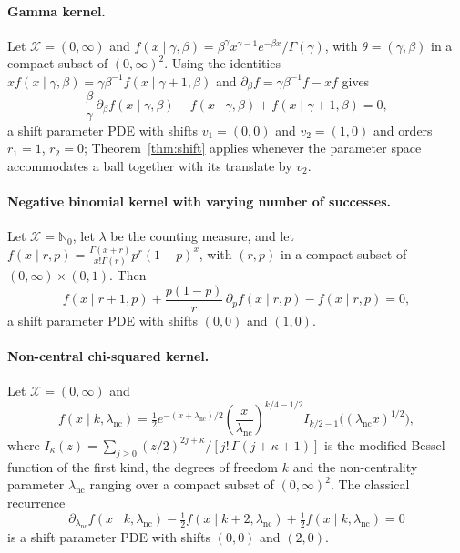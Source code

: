 \documentclass[11pt,twoside]{article} %
\begin{document}
\paragraph{Gamma kernel.} Let $\mathcal X=(0,\infty)$ and $f(x\mid\gamma,\beta)=\beta^\gamma x^{\gamma-1}e^{-\beta x}/\Gamma(\gamma)$, with $\theta =(\gamma,\beta)$ in a compact subset of $(0,\infty)^2$. Using the identities $xf(x\mid\gamma,\beta)=\gamma\beta^{-1}f(x\mid\gamma+1,\beta)$ and $\partial_\beta f=\gamma\beta^{-1}f-xf$ gives
%
\begin{equation*}
    \frac{\beta}{\gamma}\,\partial_\beta f(x\mid\gamma,\beta)-f(x\mid\gamma,\beta)+f(x\mid\gamma+1,\beta)=0,
\end{equation*}
%
a shift parameter PDE with shifts $v_1=(0,0)$ and $v_2=(1,0)$ and orders $r_1=1$, $r_2=0$; Theorem~\ref{thm:shift} applies whenever the parameter space accommodates a ball together with its translate by $v_2$.

\paragraph{Negative binomial kernel with varying number of successes.} Let $\mathcal X=\mathbb N_0$, let $\lambda$ be the counting measure, and let $f(x\mid r,p)=\frac{\Gamma(x+r)}{x!\Gamma(r)}p^r(1-p)^x$, with $(r,p)$ in a compact subset of $(0,\infty)\times(0,1)$. Then
%
\begin{equation*}
    f(x\mid r+1,p)+\frac{p(1-p)}{r}\,\partial_pf(x\mid r,p)-f(x\mid r,p)=0,
\end{equation*}
%
a shift parameter PDE with shifts $(0,0)$ and $(1,0)$.

\paragraph{Non-central chi-squared kernel.} Let $\mathcal X=(0,\infty)$ and
%
\begin{equation*}
    f(x\mid k,\lambda_{\mathrm{nc}})=\tfrac12e^{-(x+\lambda_{\mathrm{nc}})/2}\left(\frac{x}{\lambda_{\mathrm{nc}}}\right)^{k/4-1/2}I_{k/2-1}\big((\lambda_{\mathrm{nc}}x)^{1/2}\big),
\end{equation*}
%
where $I_\kappa(z)=\sum_{j\ge0}(z/2)^{2j+\kappa}/[j!\,\Gamma(j+\kappa+1)]$ is the modified Bessel function of the first kind, the degrees of freedom $k$ and the non-centrality parameter $\lambda_{\mathrm{nc}}$ ranging over a compact subset of $(0,\infty)^2$. The classical recurrence
%
\begin{equation*}
    \partial_{\lambda_{\mathrm{nc}}}f(x\mid k,\lambda_{\mathrm{nc}})-\tfrac12f(x\mid k+2,\lambda_{\mathrm{nc}})+\tfrac12f(x\mid k,\lambda_{\mathrm{nc}})=0
\end{equation*}
%
is a shift parameter PDE with shifts $(0,0)$ and $(2,0)$.
\end{document}
